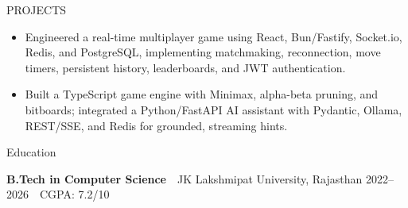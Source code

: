 \documentclass{resume} %
\begin{document}
\begin{rSection}{PROJECTS}
\begin{itemize}
\itemsep -3pt {}

\item Engineered a real-time multiplayer game using React, Bun/Fastify, Socket.io, Redis, and PostgreSQL, implementing matchmaking, reconnection, move timers, persistent history, leaderboards, and JWT authentication.

\item Built a TypeScript game engine with Minimax, alpha-beta pruning, and bitboards; integrated a Python/FastAPI AI assistant with Pydantic, Ollama, REST/SSE, and Redis for grounded, streaming hints.

\end{itemize}

\end{rSection}


\begin{rSection}{Education}

\textbf{B.Tech in Computer Science}
\,\textbar\,
JK Lakshmipat University, Rajasthan
\hfill
2022--2026
\,\textbar\,
CGPA: 7.2/10

\end{rSection}

\end{document}
